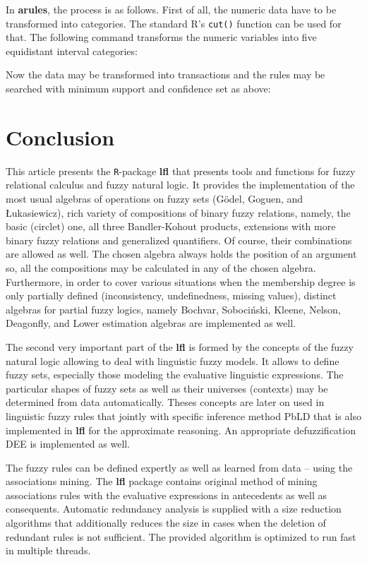 \documentclass[review]{elsarticle}
\newcommand{\pkg}[1]{\textbf{#1}}
\newcommand{\proglang}[1]{#1}
\newcommand{\code}[1]{\texttt{#1}}
\newcommand{\R}{\proglang{R}}
\begin{document}
In \pkg{arules}, the process is as follows. First of all, the numeric data have to be transformed into categories. The standard \R{}'s \texttt{cut()} function can be used for that. The following command transforms the numeric variables into five equidistant interval categories:
%

%
Now the data may be transformed into transactions and the rules may be searched with minimum support and confidence set as above:

%

%



\section{Conclusion}
\label{sec:conclusion}

This article presents the \code{R}-package \pkg{lfl} that presents tools and functions for fuzzy relational calculus and fuzzy natural logic. It provides the implementation of the most usual algebras of operations on fuzzy sets (G\"{o}del, Goguen, and \L ukasiewicz), rich variety of compositions of binary fuzzy relations, namely, the basic (circlet) one, all three Bandler-Kohout products, extensions with more binary fuzzy relations and generalized quantifiers. Of course, their combinations are allowed as well. The chosen algebra always holds the position of an argument so, all the compositions may be calculated in any of the chosen algebra. Furthermore, in order to cover various situations when the membership degree is only partially defined  (inconsistency, undefinedness, missing values), distinct algebras for partial fuzzy logics, namely Bochvar, Soboci\'{n}ski, Kleene, Nelson, Deagonfly, and Lower estimation algebras are implemented as well.  

 The second very important part of the \pkg{lfl} is formed by the concepts of the fuzzy natural logic allowing to deal with linguistic fuzzy models. It allows to define fuzzy sets, especially those modeling the evaluative linguistic expressions. The particular shapes of fuzzy sets as well as their universes (contexts) may be determined from data automatically. Theses concepts are later on used in linguistic fuzzy rules that jointly with specific inference method PbLD that is also implemented in \pkg{lfl} for the approximate reasoning. An appropriate defuzzification DEE is implemented as well. 
 
 The fuzzy rules can be defined expertly as well as learned from data -- using the associations mining. The \pkg{lfl} package contains original method of mining associations rules with the evaluative expressions in antecedents as well as consequents. Automatic redundancy analysis is supplied with a size reduction algorithms that additionally reduces the size in cases when the deletion of redundant rules is not sufficient. The provided algorithm is optimized to run fast in multiple threads.
 
\end{document}
